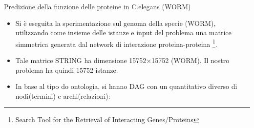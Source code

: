\documentclass[9pt]{beamer}
\begin{document}
\begin{tframe}{Predizione della funzione delle proteine in C.elegans (WORM)}
\begin{itemize}
\item Si è eseguita la sperimentazione sul genoma della specie
 (WORM), utilizzando come insieme delle  istanze e input del problema una matrice simmetrica generata dal network di interazione proteina-proteina \footnote{\footnotesize{Search Tool for the Retrieval of Interacting Genes/Proteins}}.
\item Tale matrice STRING ha dimensione 15752×15752 (WORM). Il nostro problema ha quindi 15752 istanze.
\item In base al tipo do ontologia, si hanno DAG con un quantitativo diverso di nodi(termini) e archi(relazioni): 

\begin{table}[h]
\centering
{}

\label{DAG_desc}
\end{table}
\end{itemize}
\end{tframe}
\end{document}
